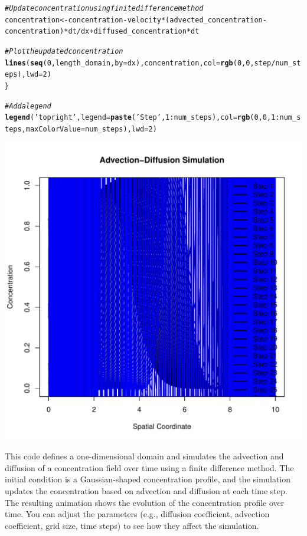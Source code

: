 \documentclass{tufte-handout}\usepackage[]{graphicx}\usepackage[]{xcolor}
\makeatletter
\def\maxwidth{ %
  \ifdim\Gin@nat@width>\linewidth
    \linewidth
  \else
    \Gin@nat@width
  \fi
}
\newcommand{\hlnum}[1]{\textcolor[rgb]{0.686,0.059,0.569}{#1}}%
\newcommand{\hlstr}[1]{\textcolor[rgb]{0.192,0.494,0.8}{#1}}%
\newcommand{\hlcom}[1]{\textcolor[rgb]{0.678,0.584,0.686}{\textit{#1}}}%
\newcommand{\hlopt}[1]{\textcolor[rgb]{0,0,0}{#1}}%
\newcommand{\hlstd}[1]{\textcolor[rgb]{0.345,0.345,0.345}{#1}}%
\newcommand{\hlkwb}[1]{\textcolor[rgb]{0.69,0.353,0.396}{#1}}%
\newcommand{\hlkwc}[1]{\textcolor[rgb]{0.333,0.667,0.333}{#1}}%
\newcommand{\hlkwd}[1]{\textcolor[rgb]{0.737,0.353,0.396}{\textbf{#1}}}%
\newenvironment{kframe}{%
 \def\at@end@of@kframe{}%
 \ifinner\ifhmode%
  \def\at@end@of@kframe{\end{minipage}}%
  \begin{minipage}{\columnwidth}%
 \fi\fi%
 \def\FrameCommand##1{\hskip\@totalleftmargin \hskip-\fboxsep
 \colorbox{shadecolor}{##1}\hskip-\fboxsep
     \hskip-\linewidth \hskip-\@totalleftmargin \hskip\columnwidth}%
 \MakeFramed {\advance\hsize-\width
   \@totalleftmargin\z@ \linewidth\hsize
   \@setminipage}}%
 {\par\unskip\endMakeFramed%
 \at@end@of@kframe}
\newenvironment{knitrout}{}{} %
\makeatother
\begin{document}
\begin{knitrout}
\begin{kframe}
\begin{alltt}
  \hlcom{# Update concentration using finite difference method}
  \hlstd{concentration} \hlkwb{<-} \hlstd{concentration} \hlopt{-} \hlstd{velocity} \hlopt{*} \hlstd{(advected_concentration} \hlopt{-} \hlstd{concentration)} \hlopt{*} \hlstd{dt} \hlopt{/} \hlstd{dx} \hlopt{+} \hlstd{diffused_concentration} \hlopt{*} \hlstd{dt}

  \hlcom{# Plot the updated concentration}
  \hlkwd{lines}\hlstd{(}\hlkwd{seq}\hlstd{(}\hlnum{0}\hlstd{, length_domain,} \hlkwc{by} \hlstd{= dx), concentration,} \hlkwc{col} \hlstd{=} \hlkwd{rgb}\hlstd{(}\hlnum{0}\hlstd{,} \hlnum{0}\hlstd{, step}\hlopt{/}\hlstd{num_steps),} \hlkwc{lwd} \hlstd{=} \hlnum{2}\hlstd{)}
\hlstd{\}}

\hlcom{# Add a legend}
\hlkwd{legend}\hlstd{(}\hlstr{'topright'}\hlstd{,} \hlkwc{legend} \hlstd{=} \hlkwd{paste}\hlstd{(}\hlstr{'Step'}\hlstd{,} \hlnum{1}\hlopt{:}\hlstd{num_steps),} \hlkwc{col} \hlstd{=} \hlkwd{rgb}\hlstd{(}\hlnum{0}\hlstd{,} \hlnum{0}\hlstd{,} \hlnum{1}\hlopt{:}\hlstd{num_steps,} \hlkwc{maxColorValue} \hlstd{= num_steps),} \hlkwc{lwd} \hlstd{=} \hlnum{2}\hlstd{)}
\end{alltt}
\end{kframe}
\includegraphics[width=\maxwidth]{figure/unnamed-chunk-3-1} 
\end{knitrout}

This code defines a one-dimensional domain and simulates the advection and diffusion of a concentration field over time using a finite difference method. The initial condition is a Gaussian-shaped concentration profile, and the simulation updates the concentration based on advection and diffusion at each time step. The resulting animation shows the evolution of the concentration profile over time. You can adjust the parameters (e.g., diffusion coefficient, advection coefficient, grid size, time steps) to see how they affect the simulation.
\end{document}
